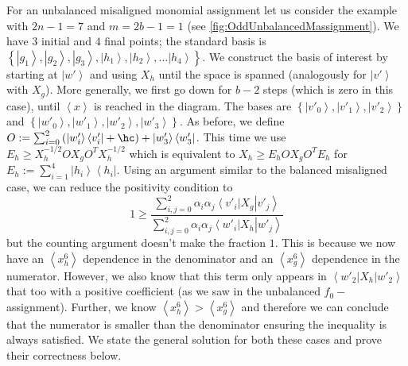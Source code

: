 \documentclass{article}
\newcommand{\atul}[1]{#1} %
\begin{document}
For an
unbalanced misaligned monomial assignment let us consider the example with $2n-1=7$
and $m=2b-1=1$ \atul{(see  \cref{fig:OddUnbalancedMassignment})}. We have $3$ initial and $4$
final points; the standard basis is\\ $\left\{ \left|g_{1}\right\rangle ,\left|g_{2}\right\rangle ,\left|g_{3}\right\rangle ,\left|h_{1}\right\rangle ,\left|h_{2}\right\rangle ,\dots\left|h_{4}\right\rangle \right\}$.
We construct the basis of interest by starting at
$\left|w'\right\rangle $
and using $X_{h}$ until the space is spanned (analogously for $\left|v'\right\rangle $ with $X_g$). More generally, we
first go down for $b-2$ steps (which is zero in this case), until
$\left\langle x\right\rangle $ is reached in the diagram. The bases
are $\left\{ \left|v'_{0}\right\rangle ,\left|v'_{1}\right\rangle ,\left|v'_{2}\right\rangle \right\} $
and $\left\{ \left|w'_{0}\right\rangle ,\left|w'_{1}\right\rangle ,\left|w'_{2}\right\rangle ,\left|w'_{3}\right\rangle \right\} $.
As before, we define $O:=\sum_{i=0}^{2}\left(\left|w'_{i}\right\rangle \left\langle v'_{i}\right|+\hc\right)+\left|w'_{3}\right\rangle \left\langle w'_{3}\right|$.
This time we
use $E_{h}\ge X_{h}^{-1/2}OX_{g}O^{T}X_{h}^{-1/2}$ which is equivalent
to $X_{h}\ge E_{h}OX_{g}O^{T}E_{h}$ for $E_{h}:=\sum_{i=1}^{4}\left|h_{i}\right\rangle \left\langle h_{i}\right|$.
Using an argument similar to the balanced misaligned case, we can
reduce the positivity condition to
\begin{displaymath}
  1\ge\frac{\sum_{i,j=0}^{2}\alpha_{i}\alpha_{j}\left\langle v'_{i}\right|X_{g}\left|v'_{j}\right\rangle }{\sum_{i,j=0}^{2}\alpha_{i}\alpha_{j}\left\langle w'_{i}\right|X_{h}\left|w'_{j}\right\rangle }
\end{displaymath}
but the counting argument doesn't make the fraction $1$. This is
because we now have an $\left\langle x_{h}^{6}\right\rangle $ dependence
in the denominator and an $\left\langle x_{g}^{6}\right\rangle $ dependence
in the numerator. However, we also know that this term only appears
in $\left\langle w'_{2}\right|X_{h}\left|w'_{2}\right\rangle $ that
too with a positive coefficient (as we saw in the unbalanced $f_{0}-$assignment). Further, we know $\left\langle x_{h}^{6}\right\rangle >\left\langle x_{g}^{6}\right\rangle $
and therefore we can conclude that the numerator is smaller than the
denominator ensuring the inequality is always satisfied.
We state the general solution for both these cases and prove their
correctness below.
\end{document}
